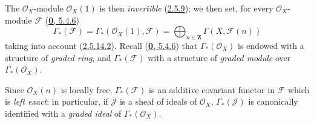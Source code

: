 \begin{env}[2.6.1]
\label{II.2.6.1}
The $\mathcal{O}_X$-module $\mathcal{O}_X(1)$ is then
\emph{invertible} (\hyperref[II.2.5.9]{2.5.9}); we then set, for every
$\mathcal{O}_X$-module $\mathcal{F}$
(\hyperref[0.5.4.6]{\textbf{0}, 5.4.6})
\[
\label{II.2.6.1.1}
  \Gamma_*(\mathcal{F})
  =\Gamma_*(\mathcal{O}_X(1),\mathcal{F})
  =\bigoplus_{n\in\mathbf{Z}}\Gamma(X,\mathcal{F}(n))
\tag{2.6.1.1}
\]
taking into account (\hyperref[II.2.5.14.2]{2.5.14.2}). Recall
(\hyperref[0.5.4.6]{\textbf{0}, 5.4.6}) that $\Gamma_*(\mathcal{O}_X)$ is endowed
with a structure of \emph{graded ring}, and $\Gamma_*(\mathcal{F})$ with a
structure of
\emph{graded module} over $\Gamma_*(\mathcal{O}_X)$.

Since $\mathcal{O}_X(n)$ is locally free, $\Gamma_*(\mathcal{F})$
is an additive covariant functor in $\mathcal{F}$ which is
\emph{left exact}; in particular, if $\mathcal{J}$
is a sheaf of ideals of $\mathcal{O}_X$, $\Gamma_*(\mathcal{J})$
is canonically identified with a
\emph{graded ideal} of $\Gamma_*(\mathcal{O}_X)$.
\end{env}

